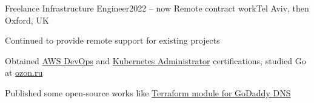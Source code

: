 







\expSubHeading
  {Freelance Infrastructure Engineer}{2022 -- now}
  {Remote contract work}{Tel Aviv, then Oxford, UK}
\begin{zitemize}
\item Continued to provide remote support for existing projects
\item Obtained \href{https://www.credly.com/badges/5b2e59d4-7b92-4512-a27f-3766fd520ad6}{AWS DevOps} and \href{https://www.credly.com/badges/35cd73fb-d95d-4f98-b7ce-caa6664475dc}{Kubernetes Administrator} certifications, studied Go at \href{https://route256.ozon.ru/}{ozon.ru}
\item Published some open-source works like \href{https://github.com/veksh/terraform-provider-godaddy-dns}{Terraform module for GoDaddy DNS}
\end{zitemize}

